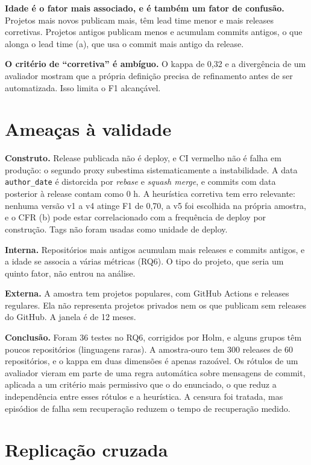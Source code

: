 \documentclass[12pt]{article}
\begin{document}
\textbf{Idade é o fator mais associado, e é também um fator de confusão.}
Projetos mais novos publicam mais, têm lead time menor e mais releases
corretivas. Projetos antigos publicam menos e acumulam commits antigos, o que
alonga o lead time (a), que usa o commit mais antigo da release.

\textbf{O critério de ``corretiva'' é ambíguo.} O kappa de 0,32 e a
divergência de um avaliador mostram que a própria definição precisa de
refinamento antes de ser automatizada. Isso limita o F1 alcançável.

\section{Ameaças à validade}

\textbf{Construto.} Release publicada não é deploy, e CI vermelho não é falha em
produção: o segundo proxy subestima sistematicamente a instabilidade. A data
\texttt{author\_date} é distorcida por \emph{rebase} e \emph{squash merge}, e
commits com data posterior à release contam como 0 h. A heurística corretiva
tem erro relevante: nenhuma versão v1 a v4 atinge F1 de 0,70, a v5 foi escolhida
na própria amostra, e o CFR (b) pode estar correlacionado com a frequência de
deploy por construção. Tags não foram usadas como unidade de deploy.

\textbf{Interna.} Repositórios mais antigos acumulam mais releases e commits
antigos, e a idade se associa a várias métricas (RQ6). O tipo do projeto, que
seria um quinto fator, não entrou na análise.

\textbf{Externa.} A amostra tem projetos populares, com GitHub Actions e
releases regulares. Ela não representa projetos privados nem os que publicam
sem releases do GitHub. A janela é de 12 meses.

\textbf{Conclusão.} Foram 36 testes no RQ6, corrigidos por Holm, e alguns
grupos têm poucos repositórios (linguagens raras). A amostra-ouro tem 300
releases de 60 repositórios, e o kappa em duas dimensões é apenas razoável. Os
rótulos de um avaliador vieram em parte de uma regra automática sobre
mensagens de commit, aplicada a um critério mais permissivo que o do enunciado,
o que reduz a independência entre esses rótulos e a heurística. A
censura foi tratada, mas episódios de falha sem recuperação reduzem o tempo de
recuperação medido.

\section{Replicação cruzada}
\end{document}
